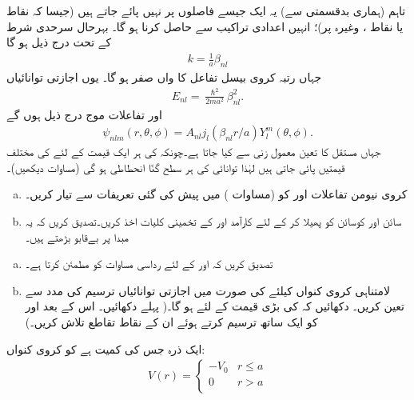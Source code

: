  تاہم (ہماری بدقسمتی سے) یہ ایک جیسے فاصلوں پر نہیں پائے جاتے ہیں (جیسا کہ نقاط  یا نقاط ، وغیرہ پر)؛ انہیں اعدادی تراکیب سے حاصل کرنا ہو گا۔ بہرحال سرحدی شرط کے تحت درج ذیل ہو گا
\begin{align}
k=\frac{1}{a}\beta_{nl} 
\end{align}
جہاں  رتبہ     کروی بیسل تفاعل کا  واں صفر   ہو گا۔ یوں اجازتی توانائیاں 
\begin{align}\label{مساوات_ابعاد_کروی_کنواں_اجازتی_توانائیاں}
E_{nl}=\frac{\hslash^{2}}{2ma^{2}}\beta_{nl}^{2}. 
\end{align}
اور تفاعلات موج درج ذیل ہوں گے 
\begin{align}
\psi_{nlm}(r,\theta,\phi)=A_{nl}j_{l}(\beta_{nl}r/a)Y_{l}^{m}(\theta,\phi). 
\end{align}
جہاں مستقل  کا تعین معمول زنی سے کیا جاتا ہے۔چونکہ  کی ہر ایک قیمت کے لئے  کی 
مختلف قیمتیں پائی جاتی ہیں لہٰذا توانائی کی ہر سطح  گنّا انحطاطی ہو گی (مساوات  دیکھیں)۔
\begin{enumerate}[a.]
\item
کروی نیومن تفاعلات  اور  کو (مساوات ) میں پیش کی گئی تعریفات سے تیار کریں۔
\item
سائن اور کوسائن کو پھیلا کر  کے لئے كارآمد   اور  کے  تخمینی کلیات  اخذ کریں۔تصدیق کریں کہ یہ مبدا پر بےقابو بڑھتے ہیں۔
\end{enumerate}
%
\begin{enumerate}[a.]
\item
 تصدیق کریں کہ  اور  کے لئے  رداسی مساوات کو مطمئن کرتا ہے۔
\item
لامتناہی کروی کنواں کیلئے  کی صورت میں اجازتی توانائیاں ترسیم کی مدد سے تعین کریں۔ دکھائیں کہ  کی بڑی قیمت کے لئے 
 ہو گا۔( پہلے  
 دکھائیں۔ اس کے بعد  اور  کو ایک ساتھ ترسیم کرتے ہوئے ان کے نقاط تقاطع تلاش کریں۔)
\end{enumerate}
%
 ایک ذرہ جس کی کمیت  ہے کو  کروی کنواں:
\begin{align*}
V(r)=\begin{cases}-V_{0}&r\le a\\0&r>a\\\end{cases} 
\end{align*}

